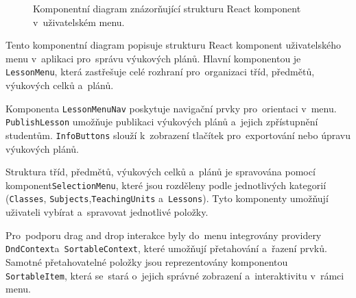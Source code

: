 \documentclass[male,czech,api_bc]{kitheses}
\begin{document}
\begin{figure}[H]
	\centering
	\caption{Komponentní diagram znázorňující strukturu React komponent v~uživatelském menu.}
	\label{fig:component-diagram-react-2}
\end{figure}

Tento komponentní diagram popisuje strukturu React komponent uživatelského menu v~aplikaci pro~správu výukových plánů. Hlavní komponentou je \texttt{LessonMenu}, která zastřešuje celé rozhraní pro~organizaci tříd, předmětů, výukových celků a~plánů.

Komponenta \texttt{LessonMenuNav} poskytuje navigační prvky pro~orientaci v~menu. \texttt{PublishLesson} umožňuje publikaci výukových plánů a~jejich zpřístupnění studentům. \texttt{InfoButtons} slouží k~zobrazení tlačítek pro~exportování nebo úpravu výukových plánů.

Struktura tříd, předmětů, výukových celků a~plánů je spravována pomocí komponent\break\texttt{SelectionMenu}, které jsou rozděleny podle jednotlivých kategorií (\texttt{Classes}, \texttt{Subjects},\break\texttt{TeachingUnits} a~\texttt{Lessons}). Tyto komponenty umožňují uživateli vybírat a~spravovat jednotlivé položky.

Pro~podporu drag and drop interakce byly do~menu integrovány providery \texttt{DndContext}\break a~\texttt{SortableContext}, které umožňují přetahování a~řazení prvků. Samotné přetahovatelné položky jsou reprezentovány komponentou \texttt{SortableItem}, která se~stará o~jejich správné zobrazení a~interaktivitu v~rámci menu.
\end{document}
